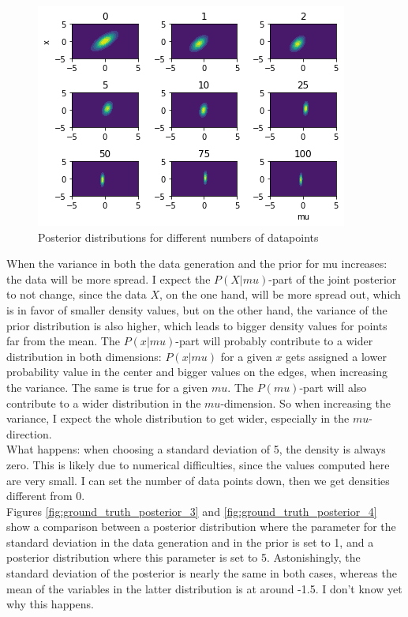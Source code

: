 \documentclass{article}
\begin{document}
\begin{figure}
	\includegraphics[width=\textwidth]{images/posterior_different_data_sizes.png}
	\caption[Posterior distributions for different numbers of datapoints]{Posterior distributions for different numbers of datapoints}
	\label{fig:posterior_different_data_sizes}
\end{figure}
When the variance in both the data generation and the prior for mu increases: the data will be more spread. I expect the $P(X|mu)$-part of the joint posterior to not change, since the data $X$, on the one hand, will be more spread out, which is in favor of smaller density values, but on the other hand, the variance of the prior distribution is also higher, which leads to bigger density values for points far from the mean. The $P(x|mu)$-part will probably contribute to a wider distribution in both dimensions: $P(x|mu)$ for a given $x$ gets assigned a lower probability value in the center and bigger values on the edges, when increasing the variance. The same is true for a given $mu$. The $P(mu)$-part will also contribute to a wider distribution in the $mu$-dimension.
So when increasing the variance, I expect the whole distribution to get wider, especially in the $mu$-direction.
\\
What happens: when choosing a standard deviation of 5, the density is always zero. This is likely due to numerical difficulties, since the values computed here are very small.
I can set the number of data points down, then we get densities different from 0.
\\
Figures  \ref{fig:ground_truth_posterior_3} and \ref{fig:ground_truth_posterior_4} show a comparison between a posterior distribution where the parameter for the standard deviation in the data generation and in the prior is set to 1, and a posterior distribution where this parameter is set to 5. Astonishingly, the standard deviation of the posterior is nearly the same in both cases, whereas the mean of the variables in the latter distribution is at around -1.5. I don't know yet why this happens. 
\end{document}
